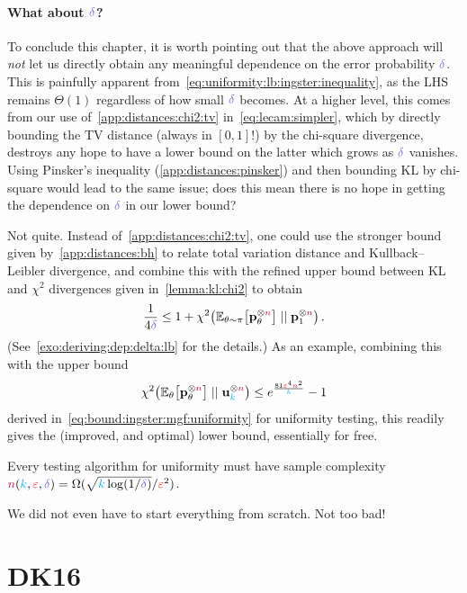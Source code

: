 \paragraph{What about $\errprob$?} To conclude this chapter, it is worth pointing out that the above approach will \emph{not} let us directly obtain any meaningful dependence on the error probability $\errprob$. This is painfully apparent from~\cref{eq:uniformity:lb:ingster:inequality}, as the LHS remains $\Theta(1)$ regardless of how small $\errprob$ becomes. At a higher level, this comes from our use of~\cref{app:distances:chi2:tv} in~\cref{eq:lecam:simpler}, which by directly bounding the TV distance (always in $[0,1]$!) by the chi-square divergence, destroys any hope to have a lower bound on the latter which grows as $\errprob$ vanishes. Using Pinsker's inequality (\cref{app:distances:pinsker}) and then bounding KL by chi-square would lead to the same issue; does this mean there is no hope in getting the dependence on $\errprob$ in our lower bound?

Not quite. Instead of~\cref{app:distances:chi2:tv}, one could use the stronger bound given by~\cref{app:distances:bh} to relate total variation distance and Kullback--Leibler divergence, and combine this with the refined upper bound between KL and $\chi^2$ divergences given in~\cref{lemma:kl:chi2} to obtain
\begin{equation}
	\label{eq:lecam:simpler:but:with:delta}
	\frac{1}{4\errprob}
	\leq 1+\chisquare{\bE{\theta\sim\pi}{\p_\theta^{\otimes\ns}}}{\p_\accept^{\otimes\ns}}\,.
\end{equation}
(See~\cref{exo:deriving:dep:delta:lb} for the details.) As an example, combining this with the upper bound 
\[
\chisquare{\bE{\theta}{\p_\theta^{\otimes\ns}}}{\uniform_\ab^{\otimes\ns}}
\leq e^{\frac{81\dst^4\ns^2}{\ab}} - 1
\]
derived in~\cref{eq:bound:ingster:mgf:uniformity} for uniformity testing, this readily gives the (improved, and optimal) lower bound, essentially for free.
\begin{theorem}
  \label{theo:uniformity:lb:ingster:with:delta}
Every testing algorithm for uniformity must have sample complexity $\ns(\ab,\dst,\errprob) = \Omega(\sqrt{\ab\log(1/\errprob)}/\dst^2)$.
\end{theorem}
\noindent We did not even have to start everything from scratch. Not too bad!
\section{DK16}

